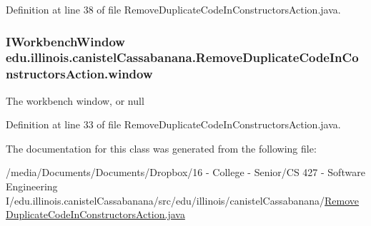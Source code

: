 Definition at line 38 of file RemoveDuplicateCodeInConstructorsAction.java.

\hypertarget{classedu_1_1illinois_1_1canistelCassabanana_1_1RemoveDuplicateCodeInConstructorsAction_adc9c8660932d820c161ecee669548037}{
\subsubsection[{window}]{\setlength{\rightskip}{0pt plus 5cm}IWorkbenchWindow {\bf edu.illinois.canistelCassabanana.RemoveDuplicateCodeInConstructorsAction.window}}}
\label{classedu_1_1illinois_1_1canistelCassabanana_1_1RemoveDuplicateCodeInConstructorsAction_adc9c8660932d820c161ecee669548037}
The workbench window, or {\ttfamily null} 

Definition at line 33 of file RemoveDuplicateCodeInConstructorsAction.java.



The documentation for this class was generated from the following file:\begin{DoxyCompactItemize}
\item 
/media/Documents/Documents/Dropbox/16 -\/ College -\/ Senior/CS 427 -\/ Software Engineering I/edu.illinois.canistelCassabanana/src/edu/illinois/canistelCassabanana/\hyperlink{RemoveDuplicateCodeInConstructorsAction_8java}{RemoveDuplicateCodeInConstructorsAction.java}\end{DoxyCompactItemize}
